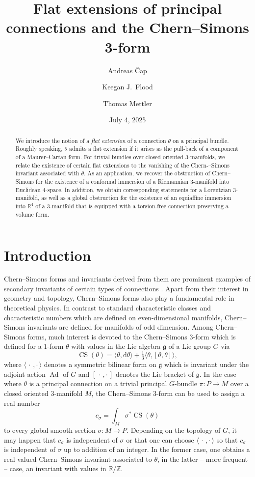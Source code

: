 \documentclass[british,11pt,a4paper]{amsart}
\title[Flat extensions and the Chern--Simons $3$-form]{Flat extensions of principal connections and the Chern--Simons $\boldsymbol{3}$-form}
\date{July 4, 2025}
\author[A.~{\v{C}}ap]{Andreas {\v{C}}ap}
\author[K.~J.~Flood]{Keegan J.~Flood}
\author[T.~Mettler]{Thomas Mettler}
\numberwithin{equation}{section}
\renewcommand{\th}{\theta}
\newcommand{\si}{\sigma}
\newcommand{\B}[2]{\langle#1,#2\rangle}
\newcommand{\CS}{\operatorname{CS}}
\newcommand{\Ad}{\operatorname{Ad}}
\newcommand{\Z}{\mathbb{Z}}
\renewcommand*{\d}{\mathrm{d}}
\newcommand*{\R}{\mathbb{R}}
\numberwithin{theorem}{section}
\theoremstyle{definition}
\theoremstyle{remark}
\begin{document}
\begin{abstract}


We introduce the notion of a \emph{flat extension} of a connection $\theta$ on a principal bundle. Roughly speaking, $\theta$ admits a flat extension if it arises as the pull-back of a component of a Maurer--Cartan form. For trivial bundles over closed oriented $3$-manifolds, we relate the existence of certain flat extensions to the vanishing of the Chern-–Simons invariant associated with $\theta$. As an application, we recover the obstruction of Chern--Simons for the existence of a conformal immersion of a Riemannian $3$-manifold into Euclidean $4$-space. In addition, we obtain corresponding statements for a Lorentzian $3$-manifold, as well as a global obstruction for the existence of an equiaffine immersion into $\R^4$ of a $3$-manifold that is equipped with a torsion-free connection preserving a volume form.


\end{abstract}

\maketitle

\section{Introduction}

Chern--Simons forms and invariants derived from them are prominent examples of secondary invariants of certain types of connections \cite{MR0353327}. Apart from their interest in geometry and topology, Chern--Simons forms also play a fundamental role in theoretical physics. In contrast to standard characteristic classes and characteristic numbers which are defined on even-dimensional manifolds, Chern--Simons invariants are defined for manifolds of odd dimension. Among Chern--Simons forms, much interest is devoted to the Chern--Simons $3$-form which is defined for a $1$-form $\theta$ with values in the Lie algebra $\mathfrak{g}$ of a Lie group $G$ via
\[
\CS(\th)=\B{\th}{\d\th}+\tfrac13 \B{\th}{[\th,\th]},
\]
where $\B{\,\cdot\,}{\cdot\,}$ denotes a symmetric bilinear form on $\mathfrak{g}$ which is invariant under the adjoint action $\Ad$ of $G$ and $[\,\cdot\,,\cdot\,]$ denotes the Lie bracket of $\mathfrak{g}$. In the case where $\theta$ is a principal connection on a trivial principal $G$-bundle $\pi : P \to M$ over a closed oriented $3$-manifold $M$, the Chern--Simons $3$-form can be used to assign a real number
\[
c_{\sigma}=\int_M \sigma^*\CS(\theta)
\] 
to every global smooth section $\sigma : M \to P$. Depending on the topology of $G$, it may happen that $c_\sigma$ is independent of $\si$ or that one can choose $\B{\,\cdot\,}{\cdot\,}$ so that $c_{\sigma}$ is independent of $\sigma$ up to addition of an integer. In the former case, one obtains a real valued Chern--Simons invariant associated to $\theta$, in the latter -- more frequent -- case, an invariant with values in $\R/\Z$. 
\end{document}
